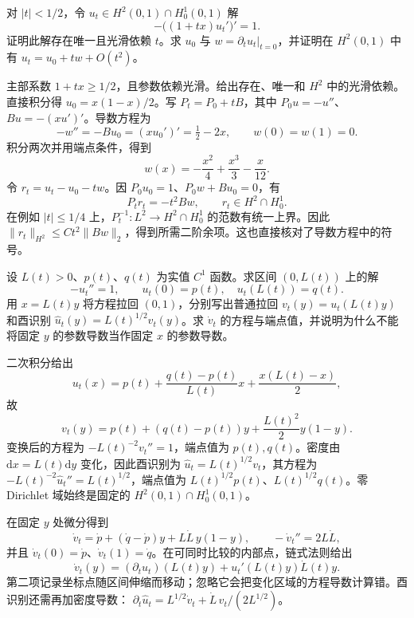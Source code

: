 \begin{exercise}\label{g3:ex:principal-coefficient-parameter}
	对 \(|t|<1/2\)，令 \(u_t\in H^2(0,1)\cap H^1_0(0,1)\) 解
	\[
		-\bigl((1+tx)u_t'\bigr)'=1.
	\]
	证明此解存在唯一且光滑依赖 \(t\)。求 \(u_0\) 与 \(w=\partial_tu_t|_{t=0}\)，并证明在 \(H^2(0,1)\) 中有 \(u_t=u_0+tw+O(t^2)\)。
\end{exercise}
\begin{solution}
	主部系数 \(1+tx\ge1/2\)，且参数依赖光滑。给出存在、唯一和 \(H^2\) 中的光滑依赖。直接积分得 \(u_0=x(1-x)/2\)。写 \(P_t=P_0+tB\)，其中 \(P_0u=-u''\)、\(Bu=-(xu')'\)。导数方程为
	\[
		-w''=-Bu_0=(xu_0')'=\tfrac12-2x,\qquad w(0)=w(1)=0.
	\]
	积分两次并用端点条件，得到
	\[
		w(x)=-\frac{x^2}{4}+\frac{x^3}{3}-\frac{x}{12}.
	\]
	令 \(r_t=u_t-u_0-tw\)。因 \(P_0u_0=1\)、\(P_0w+Bu_0=0\)，有
	\[
		P_tr_t=-t^2Bw,\qquad r_t\in H^2\cap H^1_0.
	\]
	在例如 \(|t|\le1/4\) 上，\(P_t^{-1}:L^2\to H^2\cap H^1_0\) 的范数有统一上界。因此
	\(\|r_t\|_{H^2}\le Ct^2\|Bw\|_2\)，得到所需二阶余项。这也直接核对了导数方程中的符号。
\end{solution}

\begin{exercise}\label{g3:ex:moving-interval-dirichlet}
	设 \(L(t)>0\)、\(p(t)\)、\(q(t)\) 为实值 \(C^1\) 函数。求区间 \((0,L(t))\) 上的解
	\[
		-u_t''=1,\qquad u_t(0)=p(t),\quad u_t(L(t))=q(t).
	\]
	用 \(x=L(t)y\) 将方程拉回 \((0,1)\)，分别写出普通拉回 \(v_t(y)=u_t(L(t)y)\) 和酉识别 \(\widehat u_t(y)=L(t)^{1/2}v_t(y)\)。求 \(\dot v_t\) 的方程与端点值，并说明为什么不能将固定 \(y\) 的参数导数当作固定 \(x\) 的参数导数。
\end{exercise}
\begin{solution}
	二次积分给出
	\[
		u_t(x)=p(t)+\frac{q(t)-p(t)}{L(t)}x
		+\frac{x(L(t)-x)}2,
	\]
	故
	\[
		v_t(y)=p(t)+(q(t)-p(t))y+\frac{L(t)^2}2y(1-y).
	\]
	变换后的方程为 \(-L(t)^{-2}v_t''=1\)，端点值为 \(p(t),q(t)\)。密度由 \(\mathrm dx=L(t)\mathrm dy\) 变化，因此酉识别为
	\(\widehat u_t=L(t)^{1/2}v_t\)，其方程为
	\(-L(t)^{-2}\widehat u_t''=L(t)^{1/2}\)，端点值为 \(L(t)^{1/2}p(t)\)、\(L(t)^{1/2}q(t)\)。零 Dirichlet 域始终是固定的 \(H^2(0,1)\cap H^1_0(0,1)\)。

	在固定 \(y\) 处微分得到
	\[
		\dot v_t=\dot p+ (\dot q-\dot p)y+L\dot L\,y(1-y),
		\qquad -\dot v_t''=2L\dot L,
	\]
	并且 \(\dot v_t(0)=\dot p\)、\(\dot v_t(1)=\dot q\)。在可同时比较的内部点，链式法则给出
	\[
		\dot v_t(y)=(\partial_tu_t)(L(t)y)
		+u_t'(L(t)y)\dot L(t)y.
	\]
	第二项记录坐标点随区间伸缩而移动；忽略它会把变化区域的方程导数计算错。酉识别还需再加密度导数：
	\(\partial_t\widehat u_t=L^{1/2}\dot v_t+\dot L\,v_t/(2L^{1/2})\)。
\end{solution}

